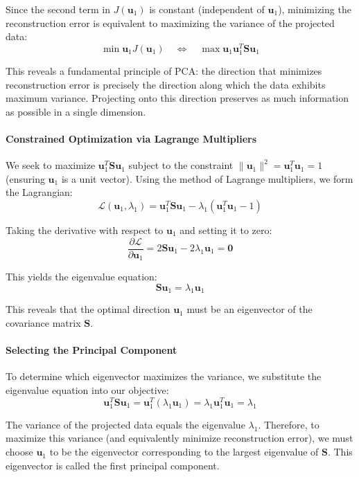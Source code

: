 Since the second term in $J(\mathbf{u}_1)$ is constant (independent of $\mathbf{u}_1$), minimizing the reconstruction error is \alert{equivalent to maximizing the variance of the projected data}:
$$
\min{\mathbf{u}_1} J(\mathbf{u}_{1}) \quad \Leftrightarrow \quad \max{\mathbf{u}_1} \mathbf{u}_{1}^{T}\mathbf{S}\mathbf{u}_{1}
$$

This reveals a fundamental principle of PCA: the direction that minimizes reconstruction error is precisely the direction along which the data exhibits maximum variance. Projecting onto this direction preserves as much information as possible in a single dimension.

\paragraph{Constrained Optimization via Lagrange Multipliers}

We seek to maximize $\mathbf{u}_{1}^{T}\mathbf{S}\mathbf{u}_{1}$ subject to the constraint $\|\mathbf{u}_{1}\|^2 = \mathbf{u}_{1}^{T}\mathbf{u}_{1}=1$ (ensuring $\mathbf{u}_1$ is a unit vector). Using the method of Lagrange multipliers, we form the Lagrangian:
$$
\mathcal{L}(\mathbf{u}_1, \lambda_1)=\mathbf{u}_{1}^{T}\mathbf{S}\mathbf{u}_{1}-\lambda_{1}(\mathbf{u}_{1}^{T}\mathbf{u}_{1}-1)
$$

Taking the derivative with respect to $\mathbf{u}_{1}$ and setting it to zero:
$$
\frac{\partial \mathcal{L}}{\partial \mathbf{u}_{1}}=2\mathbf{S}\mathbf{u}_{1}-2\lambda_{1}\mathbf{u}_{1}=\mathbf{0}
$$

This yields the \alert{eigenvalue equation}:
$$
\mathbf{S}\mathbf{u}_{1}=\lambda_{1}\mathbf{u}_{1}
$$

This reveals that the optimal direction $\mathbf{u}_{1}$ must be an \alert{eigenvector of the covariance matrix} $\mathbf{S}$.

\paragraph{Selecting the Principal Component}

To determine which eigenvector maximizes the variance, we substitute the eigenvalue equation into our objective:
$$
\mathbf{u}_{1}^{T}\mathbf{S}\mathbf{u}_{1}=\mathbf{u}_{1}^{T}(\lambda_{1}\mathbf{u}_{1})=\lambda_{1}\mathbf{u}_{1}^{T}\mathbf{u}_{1}=\lambda_{1}
$$

The variance of the projected data equals the eigenvalue $\lambda_1$. Therefore, to maximize this variance (and equivalently minimize reconstruction error), we must choose $\mathbf{u}_{1}$ to be the eigenvector corresponding to the \alert{largest eigenvalue} of $\mathbf{S}$. This eigenvector is called the \alert{first principal component}.

